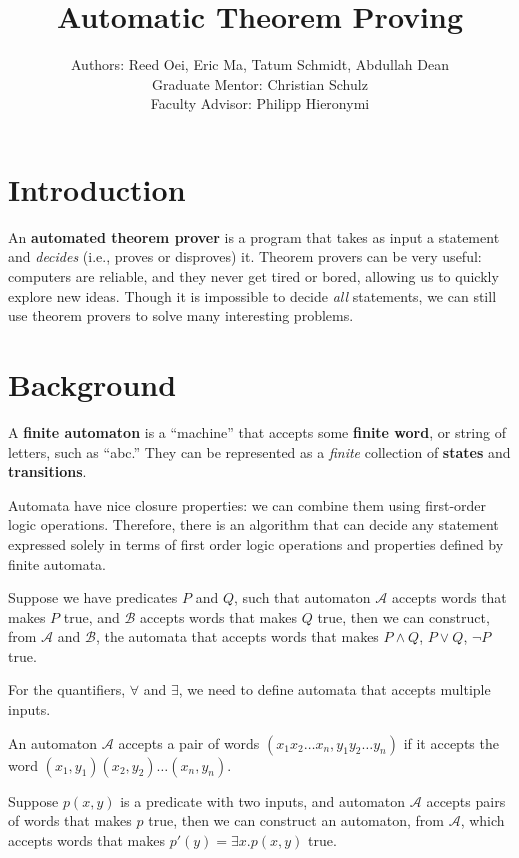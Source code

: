 \documentclass[10pt,usenames,dvipsnames]{article}
\title{Automatic Theorem Proving}
\author{%
Authors: Reed Oei, Eric Ma, Tatum Schmidt, Abdullah Dean \\
Graduate Mentor: Christian Schulz \\
Faculty Advisor: Philipp Hieronymi%
}
\begin{document}
\maketitle

\section{Introduction}

An \textbf{automated theorem prover} is a program that takes as input a statement and \emph{decides} (i.e., proves or disproves) it. 
Theorem provers can be very useful: computers are reliable, and they never get tired or bored, allowing us to quickly explore new ideas.
Though it is impossible to decide \emph{all} statements, we can still use theorem provers to solve many interesting problems. 

\section{Background}

A \textbf{finite automaton} is a ``machine'' that accepts some \textbf{finite word}, or string of letters, such as ``abc.''
They can be represented as a \emph{finite} collection of \textbf{states} and \textbf{transitions}.

Automata have nice closure properties: we can combine them using first-order logic operations.
Therefore, there is an algorithm that can decide any statement expressed solely in terms of first order logic operations and properties defined by finite automata.

\begin{theorem}{\cite{aut_theory}}
    Suppose we have predicates $P$ and $Q$, such that automaton $\mathcal{A}$ accepts words that makes $P$ true, and $\mathcal{B}$ accepts words that makes $Q$ true, then we can construct, from $\mathcal{A}$ and $\mathcal{B}$, the automata that accepts words that makes $P \land Q$, $P \lor Q$, $\lnot P$ true.
\end{theorem}

For the quantifiers, $\forall$ and $\exists$, we need to define automata that accepts multiple inputs. 
\begin{definition}
    An automaton $\mathcal{A}$ accepts a pair of words $ (x_1x_2\dots x_n, y_1y_2\dots y_n)$ if it accepts the word $(x_1,y_1)(x_2,y_2)\dots(x_n,y_n)$.
\end{definition}

\begin{theorem}\cite{aut_theory}
    Suppose $p(x,y)$ is a predicate with two inputs, and automaton $\mathcal{A}$ accepts pairs of words that makes $p$ true, then we can construct an automaton, from $\mathcal{A}$, which accepts words that makes $p'(y) = \exists x. p(x,y)$ true.
\end{theorem}
\end{document}
